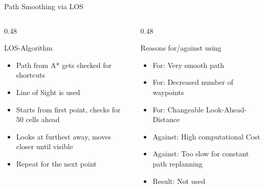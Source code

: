 \documentclass[aspectratio=169, 11pt]{beamer}
\begin{document}
\begin{frame}{Path Smoothing via LOS}
  \begin{columns}[T]
    \begin{column}{0.48\textwidth}
      \begin{block}{LOS-Algorithm}
        \small
        \begin{itemize}
          \item Path from A* gets checked for shortcuts
          \item Line of Sight is used
          \item Starts from first point, checks for 50 cells ahead
          \item Looks at furthest away, moves closer until visible
          \item Repeat for the next point
        \end{itemize}
      \end{block}
    \end{column}
    
    \begin{column}{0.48\textwidth}
      \begin{block}{Reasons for/against using}
        \small
        \begin{itemize}
          \item \textcolor{green!70!black}{For:} Very smooth path
          \item \textcolor{green!70!black}{For:} Decreased number of waypoints
          \item \textcolor{green!70!black}{For:} Changeable Look-Ahead-Distance
          \item \textcolor{red!90!black}{Against:} High computational Cost
          \item \textcolor{red!90!black}{Against:} Too slow for constant path replanning
          \item Result: Not used
        \end{itemize}
      \end{block}
    \end{column}
  \end{columns}



\end{frame}
\end{document}
